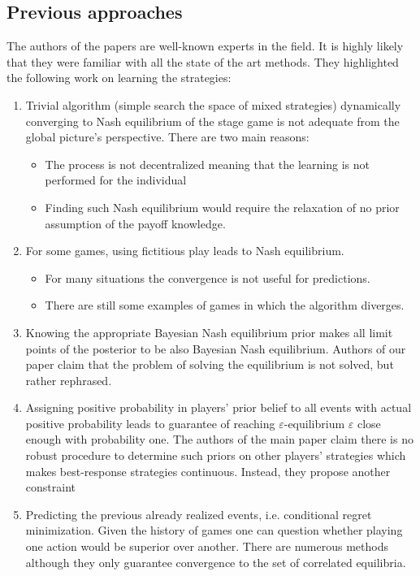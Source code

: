\documentclass[]{spie}  %
\begin{document}
\subsection{Previous approaches}
\label{sec:previous}
The authors of the papers are well-known experts in the field. It is highly likely that they were familiar with all the state of the art methods. They highlighted the following work on learning the strategies:
\begin{enumerate}
    \item Trivial algorithm (simple search the space of mixed strategies) dynamically converging to Nash equilibrium of the stage game is not adequate from the global picture's perspective. There are two main reasons:
    \begin{itemize}
        \item The process is not decentralized meaning that the learning is not performed for the individual
        \item Finding such Nash equilibrium would require the relaxation of no prior assumption of the payoff knowledge.
    \end{itemize}
    \item For some games, using fictitious play leads to Nash equilibrium. 
    \begin{itemize}
        \item For many situations the convergence is not useful for predictions.
        \item There are still some examples of games in which the algorithm diverges.
    \end{itemize}
    \item Knowing the appropriate Bayesian Nash equilibrium prior makes all limit points of the posterior to be also Bayesian Nash equilibrium. Authors of our paper claim that the problem  of solving the equilibrium is not solved, but rather rephrased.
    \item Assigning positive probability in players' prior belief to all events with actual positive probability leads to guarantee of reaching $\varepsilon$-equilibrium $\varepsilon$ close enough with probability one. The authors of the main paper claim there is no robust procedure to determine such priors on other players' strategies which makes best-response strategies continuous. Instead, they propose another constraint 
    \item Predicting the previous already realized events, i.e. conditional regret minimization. Given the history of games one can question whether playing one action would be superior over another. There are numerous methods although they only guarantee convergence to the set of correlated equilibria. 
\end{enumerate}
\end{document}
